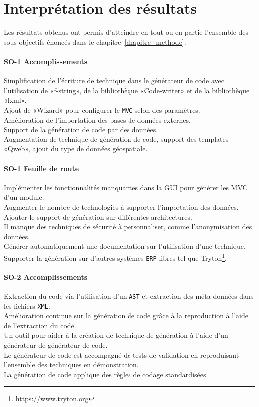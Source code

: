 \label{sec:Theme3}

\section{Interprétation des résultats}
Les résultats obtenus ont permis d’atteindre en tout ou en partie l’ensemble des sous-objectifs énoncés dans le chapitre~\ref{chapitre_methode}.%

\paragraph{SO-1 Accomplissements}
Simplification de l’écriture de technique dans le générateur de code avec l’utilisation de «f-string», de la bibliothèque «Code-writer» et de la bibliothèque «lxml».\\
Ajout de «Wizard» pour configurer le \texttt{MVC} selon des paramètres.\\
Amélioration de l’importation des bases de données externes.\\
Support de la génération de code par des données.\\
Augmentation de technique de génération de code, support des templates «Qweb», ajout du type de données géospatiale.

\paragraph{SO-1 Feuille de route}
Implémenter les fonctionnalités manquantes dans la GUI pour générer les MVC d’un module.\\
Augmenter le nombre de technologies à supporter l'importation des données.\\
Ajouter le support de génération sur différentes architectures.\\
Il manque des techniques de sécurité à personnaliser, comme l’anonymisation des données.\\
Générer automatiquement une documentation sur l’utilisation d’une technique. \\
Supporter la génération sur d’autres systèmes \texttt{ERP} libres tel que Tryton\footnote{\url{https://www.tryton.org}}.

\paragraph{SO-2 Accomplissements}
Extraction du code via l’utilisation d’un \texttt{AST} et extraction des méta-données dans les fichiers \texttt{XML}.\\
Amélioration continue sur la génération de code grâce à la reproduction à l’aide de l’extraction du code.\\
Un outil pour aider à la création de technique de génération à l’aide d’un générateur de générateur de code.\\
Le générateur de code est accompagné de tests de validation en reproduisant l’ensemble des techniques en démonstration.\\
La génération de code applique des règles de codage standardisées.

